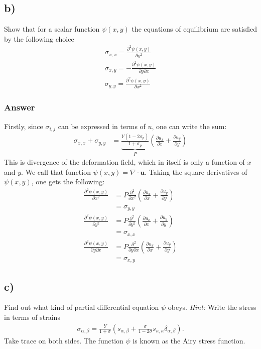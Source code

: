 \documentclass{article}
\begin{document}
\subsection*{b)}
Show that for a scalar function $\psi(x,y)$ the equations of equilibrium are satisfied by the following choice
\begin{align*}
    \sigma_{x,x} = \frac{\partial^2\psi(x,y)}{\partial y^2}\\
    \sigma_{x,y} = -\frac{\partial^2\psi(x,y)}{\partial y\partial x}\\
    \sigma_{y,y} = \frac{\partial^2\psi(x,y)}{\partial x^2}
\end{align*}

\subsubsection*{Answer}
Firstly, since $\sigma_{i,j}$ can be expressed in terms of $u$, one can write the sum:
\begin{align*}
    \sigma_{x,x} + \sigma_{y,y} &= \underbrace{\frac{Y(1-2\sigma_p)}{1+\sigma_p}}_{P}\left(\frac{\partial u_x}{\partial x} + \frac{\partial u_y}{\partial y}\right)
\end{align*}This is divergence of the deformation field, which in itself is only a function of $x$ and $y$. We call that function $\psi(x,y) = \nabla\cdot\mathbf{u}$.
Taking the square derivatives of $\psi(x,y)$, one gets the following:
\begin{align*}
    \frac{\partial^2\psi(x,y)}{\partial x^2} &= P\frac{\partial^2}{\partial x^2}\left(\frac{\partial u_x}{\partial x} + \frac{\partial u_y}{\partial y}\right)\\
    &= \sigma_{y,y}\\
    \frac{\partial^2\psi(x,y)}{\partial y^2} &= P\frac{\partial^2}{\partial y^2}\left(\frac{\partial u_x}{\partial x} + \frac{\partial u_y}{\partial y}\right)\\
    &= \sigma_{x,x}\\
    \frac{\partial^2\psi(x,y)}{\partial y\partial x} &= P\frac{\partial^2}{\partial y\partial x}\left(\frac{\partial u_x}{\partial x} + \frac{\partial u_y}{\partial y}\right)\\
    &= \sigma_{x,y}
\end{align*}


\subsection*{c)}
Find out what kind of partial differential equation $\psi$ obeys. \textit{Hint:} Write the stress in terms of strains
\begin{align*}
    \sigma_{\alpha, \beta} = \frac{Y}{1+\sigma}\left(s_{\alpha,\beta} + \frac{\sigma}{1-2\sigma}s_{\kappa, \kappa}\delta_{\alpha,\beta}\right).
\end{align*}Take trace on both sides. The function $\psi$ is known as the Airy stress function.
\end{document}
